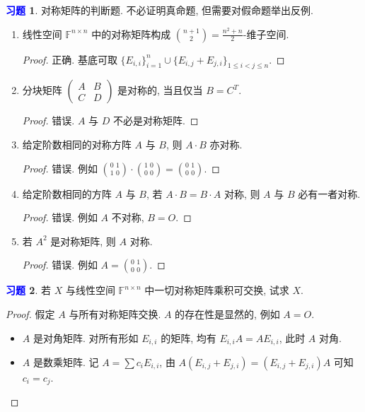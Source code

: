 \documentclass[11pt]{ctexart}
\theoremstyle{definition}
\numberwithin{equation}{section}
\theoremstyle{definition}
\newtheorem{exercise}{\textcolor{blue}{习题}}
\theoremstyle{remark}
\begin{document}
\begin{exercise}
对称矩阵的判断题. 不必证明真命题, 但需要对假命题举出反例.
\begin{enumerate}
    \item 线性空间 $\mathbb F^{n\times n}$ 中的对称矩阵构成 $\binom{n+1}{2}=\frac{n^2+n}{2}$-维子空间. 
    \begin{proof}
        正确. 基底可取 $\{E_{i,i}\}_{i=1}^n\cup \{E_{i,j}+E_{j,i}\}_{1\leq i<j\leq n}$. 
    \end{proof}
    \item 分块矩阵 $\begin{pmatrix}A&B\\C&D\end{pmatrix}$ 是对称的, 当且仅当 $B=C^T$. 
    \begin{proof}
        错误. $A$ 与 $D$ 不必是对称矩阵. 
    \end{proof}
    \item 给定阶数相同的对称方阵 $A$ 与 $B$, 则 $A\cdot B$ 亦对称. 
    \begin{proof}
        错误. 例如 $\binom{0\,\,1}{1\,\,0}\cdot \binom{1\,\,0}{0\,\,0}=\binom{0\,\,1}{0\,\,0}$. 
    \end{proof}
    \item 给定阶数相同的方阵 $A$ 与 $B$, 若 $A\cdot B=B\cdot A$ 对称, 则 $A$ 与 $B$ 必有一者对称.
    \begin{proof}
        错误. 例如 $A$ 不对称, $B=O$. 
    \end{proof}
    \item 若 $A^2$ 是对称矩阵, 则 $A$ 对称. 
    \begin{proof}
        错误. 例如 $A=\binom{0\,\,1}{0\,\,0}$. 
    \end{proof}
\end{enumerate} 
\end{exercise}

\begin{exercise}
    若 $X$ 与线性空间 $\mathbb F^{n\times n}$ 中一切对称矩阵乘积可交换, 试求 $X$. 
    \begin{proof}
        假定 $A$ 与所有对称矩阵交换. $A$ 的存在性是显然的, 例如 $A=O$. 
        \begin{itemize}
            \item $A$ 是对角矩阵. 对所有形如 $E_{i,i}$ 的矩阵, 均有 $E_{i,i}A=AE_{i,i}$, 此时 $A$ 对角. 
            \item $A$ 是数乘矩阵. 记 $A=\sum c_i E_{i,i}$, 由 $A(E_{i,j}+E_{j,i})=(E_{i,j}+E_{j,i})A$ 可知 $c_i=c_j$. 
        \end{itemize}
    \end{proof}
\end{exercise}
\end{document}
